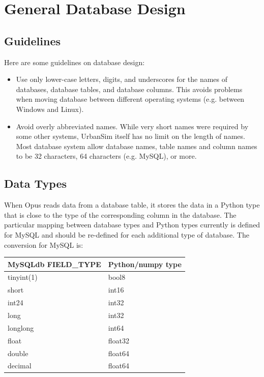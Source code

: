 \section{General Database Design}

\subsection{Guidelines}

Here are some guidelines on database design:

\begin{itemize}
\item Use only lower-case letters, digits, and underscores for the names of
databases, database tables, and database columns. This avoids problems when
moving database between different operating systems (e.g. between Windows \windowsindex and
Linux). \linuxindex
\item Avoid overly abbreviated names.  While very short names were required by
some other systems, UrbanSim itself has no limit on the length of names. Most
database system allow database names, table names and column names to be 32
characters, 64 characters (e.g. MySQL), \mysqlindex or more.
\end{itemize}

\subsection{Data Types}

   When Opus reads data from a database table, it stores the
data in a Python type that is close to the type of the corresponding
column in the database.  The particular mapping between database
types and Python types currently is defined for MySQL \mysqlindex
and should be re-defined for each additional type of database.  The
conversion for MySQL is:

\begin{tabular}{ll}
MySQLdb FIELD_TYPE & Python/numpy type \\
\hline
tinyint(1) & bool8 \\
short & int16 \\
int24 & int32 \\
long & int32 \\
longlong & int64 \\
float & float32 \\
double & float64 \\
decimal & float64 \\
\end{tabular}

